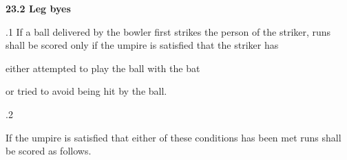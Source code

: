\documentclass[12pt]{article}
\begin{document}
\vspace{\baselineskip}
{\fontsize{11pt}{13.2pt}\selectfont \textbf{23.2 \tabto{0.47in} Leg byes}\par}\par


\vspace{\baselineskip}
\begin{adjustwidth}{0.5in}{0.12in}
{\fontsize{9pt}{10.8pt}.1 \tabto{0.49in} If a ball delivered by the bowler first strikes the person of the striker, runs shall be scored only if the umpire is satisfied that the striker has\par}\par

\end{adjustwidth}


\vspace{\baselineskip}
\begin{adjustwidth}{0.5in}{0.0in}
{\fontsize{9pt}{10.8pt}\selectfont either attempted to play the ball with the bat\par}\par

\end{adjustwidth}


\vspace{\baselineskip}

\vspace{\baselineskip}

\vspace{\baselineskip}

\vspace{\baselineskip}

\vspace{\baselineskip}
\begin{Center}
{\fontsize{8pt}{9.6pt}\par}
\end{Center}\par


\vspace{\baselineskip}
\begin{adjustwidth}{0.5in}{0.0in}
{\fontsize{9pt}{10.8pt}\selectfont or tried to avoid being hit by the ball.\par}\par

\end{adjustwidth}


\vspace{\baselineskip}
{\fontsize{9pt}{10.8pt}.2 \tabto{0.49in} {\fontsize{8pt}{9.6pt}\selectfont If the umpire is satisfied that either of these conditions has been met runs shall be scored as follows.\par}\par}\par
\end{document}
